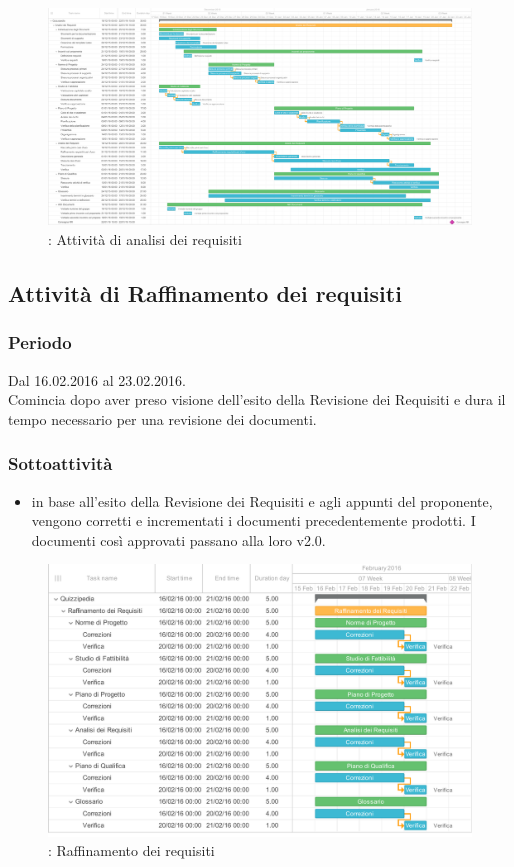 \documentclass[a4paper, titlepage]{article}
\begin{document}
	\newpage
	\begin{figure}
		\includegraphics[scale=0.25]{Img/Grafici_Gantt/Analisi_dei_requisiti.pdf}
		\caption{ : Attività di analisi dei requisiti}
	\end{figure}
	
	\subsection{Attività di Raffinamento dei requisiti}
	\subsubsection{Periodo}
	Dal 16.02.2016 al 23.02.2016.\\
	Comincia dopo aver preso visione dell'esito della Revisione dei Requisiti e dura il tempo necessario per una revisione dei documenti.
	
	
	\subsubsection{Sottoattività}
	\begin{itemize}
		\item {} in base all'esito della Revisione dei Requisiti e agli appunti del proponente, vengono corretti e incrementati i documenti precedentemente prodotti. I documenti così approvati passano alla loro v2.0.
	\end{itemize}
	
	\newpage
	\begin{figure}
		\includegraphics[scale=0.7]{Img/Grafici_Gantt/Raffinamento_requisiti.pdf}
		\caption{ : Raffinamento dei requisiti}
	\end{figure}
	
\end{document}

